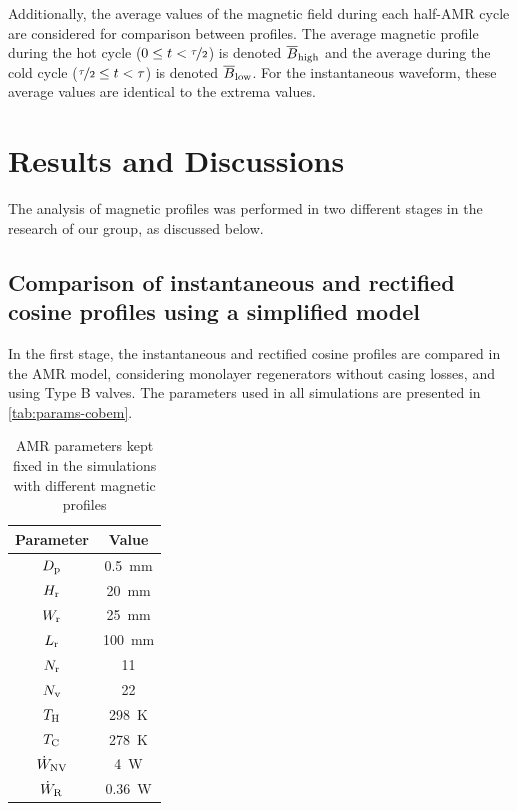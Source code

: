 \documentclass[referee]{svjour3}
\begin{document}

Additionally, the average values of the magnetic field during each half-AMR cycle are considered for comparison between profiles. The average magnetic profile during the hot cycle ($0 \le t < \nicefrac{\tau}{2}$) is denoted $\overline{B}_{\mathrm{high}}$ and the average during the cold cycle  ($ \nicefrac{\tau}{2} \le t < \tau$) is denoted $\overline{B}_{\mathrm{low}}$. For the instantaneous waveform, these average values are identical to the extrema values.


\section{Results and Discussions}
\label{sec:results-discussions}

The analysis of magnetic profiles was performed in two different stages in the research of our group, as discussed below.

\subsection{Comparison of instantaneous and rectified cosine profiles using a simplified model}
\label{sec:comp-cosine-inst}

In the first stage, the instantaneous and rectified cosine profiles are compared in the AMR model, considering monolayer regenerators without casing losses, and using Type B valves. The parameters used in all simulations are presented in \autoref{tab:params-cobem}.

\begin{table}[!ht]
  \centering
  \caption{AMR parameters kept fixed in the simulations with different magnetic profiles}
  \begin{tabular}{c|c}
\hline
\textbf{Parameter} & \textbf{Value}\\
\hline
   $D_{\mathrm{p}}$ & \SI{0.5}{\mm}\\
$H_{\mathrm{r}}$ & \SI{20}{\mm}\\
$W_{\mathrm{r}}$ & \SI{25}{\mm}\\
$L_{\mathrm{r}}$ & \SI{100}{\mm}\\
$N_{\mathrm{r}}$ & 11 \\
$N_{\mathrm{v}}$ & 22 \\
$T_{\mathrm{H}}$ & \SI{298}{\kelvin}\\
$T_{\mathrm{C}}$ & \SI{278}{\kelvin}\\
$\dot{W}_{\mathrm{NV}}$ & \SI{4}{\watt}\\
$\dot{W}_{\mathrm{R}}$ & \SI{0.36}{\watt}\\
\hline
  \end{tabular}

  \label{tab:params-cobem}
\end{table}
\end{document}
